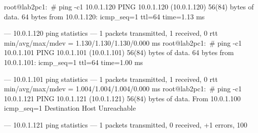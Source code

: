 root@lab2pc1:~# ping -c1 10.0.1.120
PING 10.0.1.120 (10.0.1.120) 56(84) bytes of data.
64 bytes from 10.0.1.120: icmp_seq=1 ttl=64 time=1.13 ms

--- 10.0.1.120 ping statistics ---
1 packets transmitted, 1 received, 0%
rtt min/avg/max/mdev = 1.130/1.130/1.130/0.000 ms
root@lab2pc1:~# ping -c1 10.0.1.101
PING 10.0.1.101 (10.0.1.101) 56(84) bytes of data.
64 bytes from 10.0.1.101: icmp_seq=1 ttl=64 time=1.00 ms

--- 10.0.1.101 ping statistics ---
1 packets transmitted, 1 received, 0%
rtt min/avg/max/mdev = 1.004/1.004/1.004/0.000 ms
root@lab2pc1:~# ping -c1 10.0.1.121
PING 10.0.1.121 (10.0.1.121) 56(84) bytes of data.
From 10.0.1.100 icmp_seq=1 Destination Host Unreachable

--- 10.0.1.121 ping statistics ---
1 packets transmitted, 0 received, +1 errors, 100%
